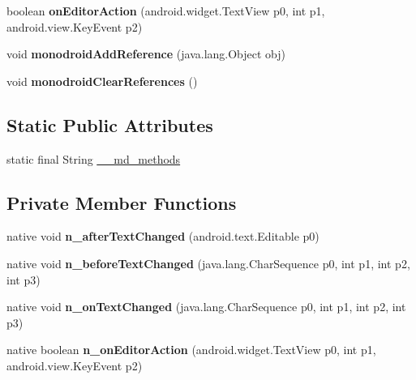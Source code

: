 \begin{DoxyCompactItemize}
boolean {\bfseries on\+Editor\+Action} (android.\+widget.\+Text\+View p0, int p1, android.\+view.\+Key\+Event p2)
\item 
\mbox{\label{classmd5b60ffeb829f638581ab2bb9b1a7f4f3f_1_1EntryRenderer_a874980e2f1e04a1474a4c5ff9a052a13}} 
void {\bfseries monodroid\+Add\+Reference} (java.\+lang.\+Object obj)
\item 
\mbox{\label{classmd5b60ffeb829f638581ab2bb9b1a7f4f3f_1_1EntryRenderer_a5ad12d956145127cb1bb040a5c2d369b}} 
void {\bfseries monodroid\+Clear\+References} ()
\end{DoxyCompactItemize}
\subsection*{Static Public Attributes}
\begin{DoxyCompactItemize}
\item 
static final String \hyperlink{classmd5b60ffeb829f638581ab2bb9b1a7f4f3f_1_1EntryRenderer_ad2206e7a8e60b685459381a385bdf9f1}{\+\_\+\+\_\+md\+\_\+methods}
\end{DoxyCompactItemize}
\subsection*{Private Member Functions}
\begin{DoxyCompactItemize}
\item 
\mbox{\label{classmd5b60ffeb829f638581ab2bb9b1a7f4f3f_1_1EntryRenderer_a19c60f5a213260e268a0c3061f5c578b}} 
native void {\bfseries n\+\_\+after\+Text\+Changed} (android.\+text.\+Editable p0)
\item 
\mbox{\label{classmd5b60ffeb829f638581ab2bb9b1a7f4f3f_1_1EntryRenderer_a5e50e6e61a8fdcb222dfa9c050b9be15}} 
native void {\bfseries n\+\_\+before\+Text\+Changed} (java.\+lang.\+Char\+Sequence p0, int p1, int p2, int p3)
\item 
\mbox{\label{classmd5b60ffeb829f638581ab2bb9b1a7f4f3f_1_1EntryRenderer_a7ee8490c38f7d8a07c71c77cd5f9b329}} 
native void {\bfseries n\+\_\+on\+Text\+Changed} (java.\+lang.\+Char\+Sequence p0, int p1, int p2, int p3)
\item 
\mbox{\label{classmd5b60ffeb829f638581ab2bb9b1a7f4f3f_1_1EntryRenderer_a44c5149ccd87fb1b791211a11c6dd8ee}} 
native boolean {\bfseries n\+\_\+on\+Editor\+Action} (android.\+widget.\+Text\+View p0, int p1, android.\+view.\+Key\+Event p2)
\end{DoxyCompactItemize}
